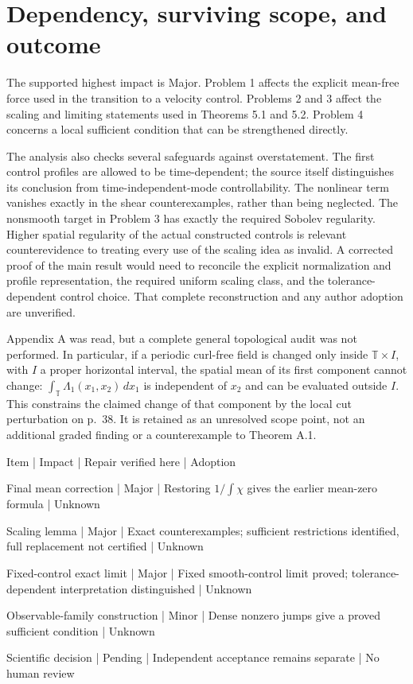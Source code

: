 \documentclass[10pt]{article}
\begin{document}
\section*{Dependency, surviving scope, and outcome}
The supported highest impact is Major. Problem 1 affects the explicit mean-free force used in the transition to a velocity control. Problems 2 and 3 affect the scaling and limiting statements used in Theorems 5.1 and 5.2. Problem 4 concerns a local sufficient condition that can be strengthened directly.\par
The analysis also checks several safeguards against overstatement. The first control profiles are allowed to be time-dependent; the source itself distinguishes its conclusion from time-independent-mode controllability. The nonlinear term vanishes exactly in the shear counterexamples, rather than being neglected. The nonsmooth target in Problem 3 has exactly the required Sobolev regularity. Higher spatial regularity of the actual constructed controls is relevant counterevidence to treating every use of the scaling idea as invalid. A corrected proof of the main result would need to reconcile the explicit normalization and profile representation, the required uniform scaling class, and the tolerance-dependent control choice. That complete reconstruction and any author adoption are unverified.\par
Appendix A was read, but a complete general topological audit was not performed. In particular, if a periodic curl-free field is changed only inside \(\mathbb T\times I\), with \(I\) a proper horizontal interval, the spatial mean of its first component cannot change: \(\int_{\mathbb T}\Lambda_1(x_1,x_2)\,dx_1\) is independent of \(x_2\) and can be evaluated outside \(I\). This constrains the claimed change of that component by the local cut perturbation on p. 38. It is retained as an unresolved scope point, not an additional graded finding or a counterexample to Theorem A.1.\par
Item | Impact | Repair verified here | Adoption\par
Final mean correction | Major | Restoring \(1/\int\chi\) gives the earlier mean-zero formula | Unknown\par
Scaling lemma | Major | Exact counterexamples; sufficient restrictions identified, full replacement not certified | Unknown\par
Fixed-control exact limit | Major | Fixed smooth-control limit proved; tolerance-dependent interpretation distinguished | Unknown\par
Observable-family construction | Minor | Dense nonzero jumps give a proved sufficient condition | Unknown\par
Scientific decision | Pending | Independent acceptance remains separate | No human review\par
\end{document}
